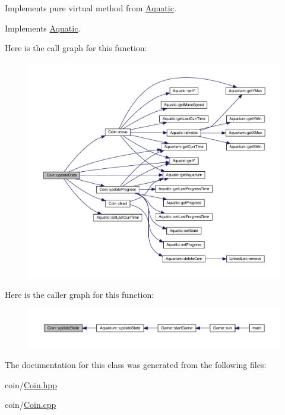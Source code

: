 Implements pure virtual method from \mbox{\hyperlink{class_aquatic}{Aquatic}}. 



Implements \mbox{\hyperlink{class_aquatic_a51e44c95476d72a841fea667c6cbbedc}{Aquatic}}.

Here is the call graph for this function\+:\nopagebreak
\begin{figure}[H]
\begin{center}
\leavevmode
\includegraphics[width=350pt]{class_coin_ac9d03cbd68f9ccb739895832f77d60a3_cgraph}
\end{center}
\end{figure}
Here is the caller graph for this function\+:\nopagebreak
\begin{figure}[H]
\begin{center}
\leavevmode
\includegraphics[width=350pt]{class_coin_ac9d03cbd68f9ccb739895832f77d60a3_icgraph}
\end{center}
\end{figure}


The documentation for this class was generated from the following files\+:\begin{DoxyCompactItemize}
\item 
coin/\mbox{\hyperlink{_coin_8hpp}{Coin.\+hpp}}\item 
coin/\mbox{\hyperlink{_coin_8cpp}{Coin.\+cpp}}\end{DoxyCompactItemize}
